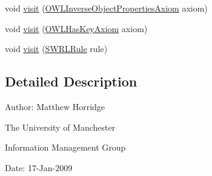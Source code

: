 \begin{DoxyCompactItemize}
\item 
void \hyperlink{interfaceorg_1_1semanticweb_1_1owlapi_1_1model_1_1_o_w_l_logical_axiom_visitor_a1f788d390db4871f71a30bb0411ec686}{visit} (\hyperlink{interfaceorg_1_1semanticweb_1_1owlapi_1_1model_1_1_o_w_l_inverse_object_properties_axiom}{O\-W\-L\-Inverse\-Object\-Properties\-Axiom} axiom)
\item 
void \hyperlink{interfaceorg_1_1semanticweb_1_1owlapi_1_1model_1_1_o_w_l_logical_axiom_visitor_a01069bbf2adfc0e0d825d9e6e2a3d798}{visit} (\hyperlink{interfaceorg_1_1semanticweb_1_1owlapi_1_1model_1_1_o_w_l_has_key_axiom}{O\-W\-L\-Has\-Key\-Axiom} axiom)
\item 
void \hyperlink{interfaceorg_1_1semanticweb_1_1owlapi_1_1model_1_1_o_w_l_logical_axiom_visitor_a23dc2925e1b3ba2a2f99fa1af3d77bc0}{visit} (\hyperlink{interfaceorg_1_1semanticweb_1_1owlapi_1_1model_1_1_s_w_r_l_rule}{S\-W\-R\-L\-Rule} rule)
\end{DoxyCompactItemize}


\subsection{Detailed Description}
Author\-: Matthew Horridge\par
 The University of Manchester\par
 Information Management Group\par
 Date\-: 17-\/\-Jan-\/2009 

